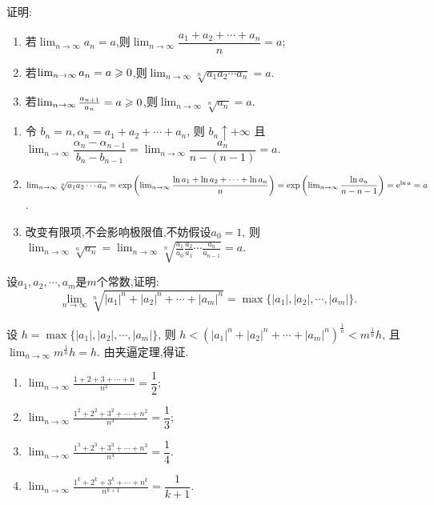 \begin{example}
    证明:
    \begin{enumerate}
        \item 若$\lim_{n \to \infty} a_n = a $,则$\lim_{n \to \infty} \dfrac{a_1+a_2+\cdots+a_n}{n}=a$;
        \item 若$\lim_{n \to \infty} a_n = a \geqslant 0$,则$\lim_{n \to \infty} \sqrt[n]{a_1a_2\cdots a_n}=a$.
        \item 若$\lim_{n \to \infty} \frac{a_{n+1}}{a_n}=a \geqslant 0$,则$\lim_{n \to \infty} \sqrt[n]{a_n}=a$.
    \end{enumerate}

    \begin{solution}
        \begin{enumerate}
            \item
                  令 $b_n = n , \alpha_n = a_1 + a_2 + \cdots + a_n$, 则 $b_n \uparrow +\infty$ 且 $\lim_{n \to \infty} \dfrac{\alpha_n - \alpha_{n-1}}{b_n - b_{n-1}} = \lim_{n \to \infty} \dfrac{a_n}{n - (n-1)} = a$.
            \item
                  $ \lim_{n \to \infty} \sqrt[n]{a_1a_2\cdots a_n} = \exp \left( {\lim_{n \to \infty} \dfrac{\ln a_1 + \ln a_2 + \cdots + \ln a_n}{n}} \right) = \exp \left( {\lim_{n \to \infty} \dfrac{\ln a_n}{n - {n-1}}} \right) = \mathrm{e}^{\ln a} = a$.
            \item
                  改变有限项,不会影响极限值,不妨假设$a_0 = 1 $, 则 $\lim_{n \to \infty} \sqrt[n]{a_n} = \lim_{n \to \infty} \sqrt[n]{ \frac{a_1}{a_0} \frac{a_2}{a_1} \cdots \frac{a_n}{a_{n-1}}} = a $.

        \end{enumerate}
    \end{solution}
\end{example}

\begin{example}
    设$a_1,a_2, \cdots, a_m$是$m$个常数,证明:
    $$\lim_{n \to \infty} \sqrt[n]{|a_1|^n+|a_2|^n+\cdots+|a_m|^n}=\max\{|a_1|,|a_2|,\cdots,|a_m|\}.$$
\end{example}

\begin{solution}
    设 $ h = \max\{|a_1|,|a_2|,\cdots,|a_m|\}$, 则 $ h < \left( |a_1|^n + |a_2|^n + \cdots + |a_m|^n \right)^{\frac{1}{n}} < m^{\frac{1}{n}} h $, 且 $\lim_{n \to \infty} m^{\frac{1}{n}} h = h$. 由夹逼定理,得证.
\end{solution}

\begin{example}
    \begin{enumerate}
        \item $\lim_{n \to \infty} \frac{1+2+3+\cdots + n}{n^2}=\dfrac 12$;
        \item $\lim_{n \to \infty} \frac{1^2+2^2+3^2+\cdots + n^2}{n^3}=\dfrac 13$;
        \item $\lim_{n \to \infty} \frac{1^3+2^3+3^3+\cdots + n^3}{n^4}=\dfrac 14$.
        \item $\lim_{n \to \infty} \frac{1^k+2^k+3^k+\cdots + n^k}{n^{k+1}}=\dfrac 1{k+1}$.
    \end{enumerate}
\end{example}

